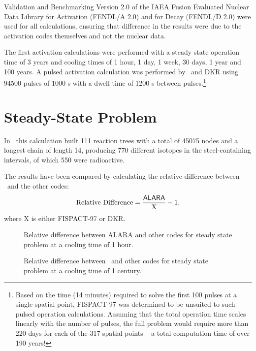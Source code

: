 \begin{chapter}{Validation and Benchmarking}
Version 2.0 of the IAEA Fusion Evaluated Nuclear Data Library for
Activation (FENDL/A 2.0) and for Decay (FENDL/D 2.0) were used for all
calculations, ensuring that difference in the results were due to the
activation codes themselves and not the nuclear data.

The first activation calculations were performed with a steady state
operation time of 3 years and cooling times of 1 hour, 1 day, 1 week,
30 days, 1 year and 100 years.  A pulsed activation calculation was
performed by \ALARA\ and DKR using 94500 pulses of 1000 s with a dwell
time of 1200 s between pulses.\footnote{Based on the time (14 minutes)
  required to solve the first 100 pulses at a single spatial point,
  FISPACT-97 was determined to be unsuited to such pulsed operation
  calculations.  Assuming that the total operation time scales
  linearly with the number of pulses, the full problem would require
  more than 220 days for each of the 317 spatial points -- a total
  computation time of over 190 years!}

\section{Steady-State Problem}

In \ALARA\, this calculation built 111 reaction trees with a total of
45075 nodes and a longest chain of length 14, producing 770 different
isotopes in the steel-containing intervals, of which 550 were
radioactive.

The results have been compared by calculating the relative difference
between \ALARA\ and the other codes:
$$\mbox{Relative Difference} = \frac{\mbox{\textsf{ALARA}}}{\mbox{X}} - 1,$$
where X is either FISPACT-97 or DKR.  

\begin{figure}[htbp]
  \begin{center}
    \caption{Relative difference between ALARA and other codes for
      steady state problem at a cooling time of 1 hour.}
    \label{fig:rel.diff.ss.1}
  \end{center}
\end{figure}

\begin{figure}[htbp]
  \begin{center}
    \caption{Relative difference between \ALARA\ and other codes for
      steady state problem at a cooling time of 1 century.}
    \label{fig:rel.diff.ss.2}
  \end{center}
\end{figure}


\end{chapter}
